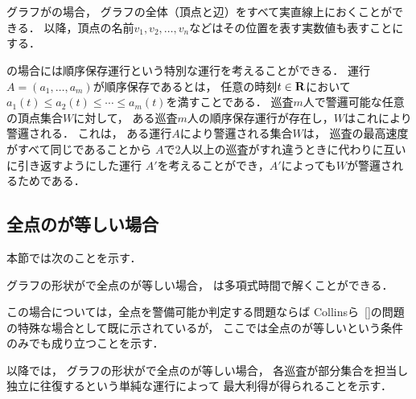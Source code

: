\section{{\graphLine}}
\label{section: line}

グラフが{\graphLine}の場合，
グラフの全体（頂点と辺）をすべて実直線上におくことができる．
以降，頂点の名前$v_1, v_2, \ldots, v_n$などはその位置を表す実数値も表すことにする．

{\graphLine}の場合には順序保存運行という特別な運行を考えることができる．
運行$A = (a_1, \ldots, a_m)$が順序保存であるとは，
任意の時刻$t \in \mathbf R$において
$a_1(t) \leq a_2(t) \leq \cdots \leq a_m(t)$を満すことである．
巡査$m$人で警邏可能な任意の頂点集合$W$に対して，
ある巡査$m$人の順序保存運行が存在し，$W$はこれにより警邏される．
これは，
ある運行$A$により警邏される集合$W$は，
巡査の最高速度がすべて同じであることから
$A$で2人以上の巡査がすれ違うときに代わりに互いに引き返すようにした運行
$A'$を考えることができ，$A'$によっても$W$が警邏されるためである．



\subsection{全点の{\idletime}が等しい場合}
\label{subsec:LineUnaryTimelimit}


本節では次のことを示す．

\begin{theo}
  \label{theo:LineEqualTimelimit}
  グラフの形状が{\graphLine}で全点の{\idletime}が等しい場合，
  {\patProb}は多項式時間で解くことができる．
\end{theo}

この場合については，全点を警備可能か判定する問題ならば
Collinsら~\ref{}の問題の特殊な場合として既に示されているが，
ここでは全点の{\idletime}が等しいという条件のみでも成り立つことを示す．

以降では，
グラフの形状が{\graphLine}で全点の{\idletime}が等しい場合，
各巡査が部分集合を担当し独立に往復するという単純な運行によって
最大利得が得られることを示す．




